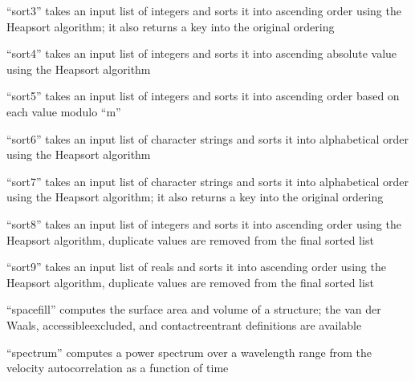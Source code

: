 \documentclass[letterpaper,11pt,english]{sphinxmanual}
\begin{document}
\sphinxAtStartPar
“sort3” takes an input list of integers and sorts it into ascending order using the Heapsort algorithm; it also returns a key into the original ordering

\sphinxAtStartPar
{}

\sphinxAtStartPar
“sort4” takes an input list of integers and sorts it into ascending absolute value using the Heapsort algorithm

\sphinxAtStartPar
{}

\sphinxAtStartPar
“sort5” takes an input list of integers and sorts it into ascending order based on each value modulo “m”

\sphinxAtStartPar
{}

\sphinxAtStartPar
“sort6” takes an input list of character strings and sorts it into alphabetical order using the Heapsort algorithm

\sphinxAtStartPar
{}

\sphinxAtStartPar
“sort7” takes an input list of character strings and sorts it into alphabetical order using the Heapsort algorithm; it also returns a key into the original ordering

\sphinxAtStartPar
{}

\sphinxAtStartPar
“sort8” takes an input list of integers and sorts it into ascending order using the Heapsort algorithm, duplicate values are removed from the final sorted list

\sphinxAtStartPar
{}

\sphinxAtStartPar
“sort9” takes an input list of reals and sorts it into ascending order using the Heapsort algorithm, duplicate values are removed from the final sorted list

\sphinxAtStartPar
{}

\sphinxAtStartPar
“spacefill” computes the surface area and volume of a structure; the van der Waals, accessible\sphinxhyphen{}excluded, and contact\sphinxhyphen{}reentrant definitions are available

\sphinxAtStartPar
{}

\sphinxAtStartPar
“spectrum” computes a power spectrum over a wavelength range from the velocity autocorrelation as a function of time

\sphinxAtStartPar
{}
\end{document}
